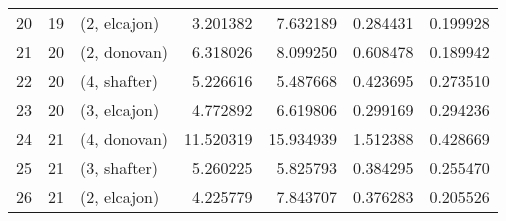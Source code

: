 \begin{tabular}{lllrrrr}
20 &    19 &  (2, elcajon) &   3.201382 &   7.632189 &   0.284431 &  0.199928 \\
21 &    20 &  (2, donovan) &   6.318026 &   8.099250 &   0.608478 &  0.189942 \\
22 &    20 &  (4, shafter) &   5.226616 &   5.487668 &   0.423695 &  0.273510 \\
23 &    20 &  (3, elcajon) &   4.772892 &   6.619806 &   0.299169 &  0.294236 \\
24 &    21 &  (4, donovan) &  11.520319 &  15.934939 &   1.512388 &  0.428669 \\
25 &    21 &  (3, shafter) &   5.260225 &   5.825793 &   0.384295 &  0.255470 \\
26 &    21 &  (2, elcajon) &   4.225779 &   7.843707 &   0.376283 &  0.205526 \\
\bottomrule
\end{tabular}

